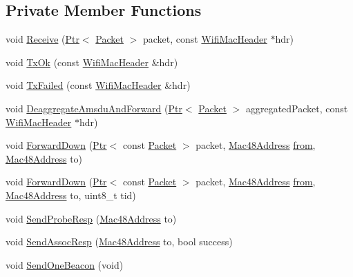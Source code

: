 \subsection*{Private Member Functions}
\begin{DoxyCompactItemize}
\item 
void \hyperlink{classns3_1_1ApWifiMac_ab7e832f29bf91319e3ecdf0de7d5d598}{Receive} (\hyperlink{classns3_1_1Ptr}{Ptr}$<$ \hyperlink{classns3_1_1Packet}{Packet} $>$ packet, const \hyperlink{classns3_1_1WifiMacHeader}{Wifi\+Mac\+Header} $\ast$hdr)
\item 
void \hyperlink{classns3_1_1ApWifiMac_a42c321554bcf340cf7d3da46ad95b836}{Tx\+Ok} (const \hyperlink{classns3_1_1WifiMacHeader}{Wifi\+Mac\+Header} \&hdr)
\item 
void \hyperlink{classns3_1_1ApWifiMac_aecabca257eb2b43205eeefd63d09de95}{Tx\+Failed} (const \hyperlink{classns3_1_1WifiMacHeader}{Wifi\+Mac\+Header} \&hdr)
\item 
void \hyperlink{classns3_1_1ApWifiMac_a1eb0f6a5911786e99fc0b58fd2a0e356}{Deaggregate\+Amsdu\+And\+Forward} (\hyperlink{classns3_1_1Ptr}{Ptr}$<$ \hyperlink{classns3_1_1Packet}{Packet} $>$ aggregated\+Packet, const \hyperlink{classns3_1_1WifiMacHeader}{Wifi\+Mac\+Header} $\ast$hdr)
\item 
void \hyperlink{classns3_1_1ApWifiMac_a407bd4754f3f401eb6c5b4a4fe622250}{Forward\+Down} (\hyperlink{classns3_1_1Ptr}{Ptr}$<$ const \hyperlink{classns3_1_1Packet}{Packet} $>$ packet, \hyperlink{classns3_1_1Mac48Address}{Mac48\+Address} \hyperlink{lte__amc_8m_a1b4c81ff74eb1a626b5ade44c81004b3}{from}, \hyperlink{classns3_1_1Mac48Address}{Mac48\+Address} to)
\item 
void \hyperlink{classns3_1_1ApWifiMac_abcc518337b1ccf6ebd983bc36a004bb4}{Forward\+Down} (\hyperlink{classns3_1_1Ptr}{Ptr}$<$ const \hyperlink{classns3_1_1Packet}{Packet} $>$ packet, \hyperlink{classns3_1_1Mac48Address}{Mac48\+Address} \hyperlink{lte__amc_8m_a1b4c81ff74eb1a626b5ade44c81004b3}{from}, \hyperlink{classns3_1_1Mac48Address}{Mac48\+Address} to, uint8\+\_\+t tid)
\item 
void \hyperlink{classns3_1_1ApWifiMac_a0a9fcbd87326c5c56644deb3504038df}{Send\+Probe\+Resp} (\hyperlink{classns3_1_1Mac48Address}{Mac48\+Address} to)
\item 
void \hyperlink{classns3_1_1ApWifiMac_a0a36426da94f43b0a9136adf4e58f425}{Send\+Assoc\+Resp} (\hyperlink{classns3_1_1Mac48Address}{Mac48\+Address} to, bool success)
\item 
void \hyperlink{classns3_1_1ApWifiMac_a6c8cbc0fc95f3eaf4840d4ffcf78fac5}{Send\+One\+Beacon} (void)

\end{DoxyCompactItemize}
